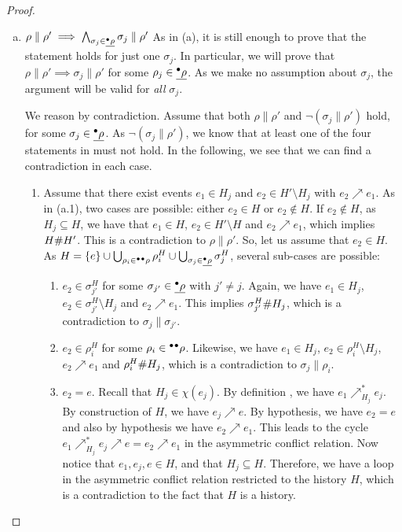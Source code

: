 \begin{proof}
\begin{enumerate}[(a)]
\item $\rho \parallel \rho' \implies \bigwedge_{\sigma_j \in \underline{{}^\bullet\rho}}
\sigma_j \parallel \rho'$  As in (a), it is still enough to prove that the
statement holds for just one $\sigma_j$.  In particular, we will prove that
$\rho \parallel \rho' \implies \sigma_j \parallel \rho'$ for some $\rho_j \in
\underline{{}^\bullet\rho}$.  As we make no assumption about $\sigma_j$, the argument will be
valid for \emph{all} $\sigma_j$.

We reason by contradiction.  Assume that both $\rho \parallel \rho'$ and $\lnot
(\sigma_j \parallel \rho')$ hold, for some $\sigma_j \in \underline{{}^\bullet\rho}$.  As
$\lnot (\sigma_j \parallel \rho')$, we know that at least one of the four
statements in  must not hold.  In the following, we see
that we can find a contradiction in each case.

\begin{enumerate}[1.]
\item Assume that there exist events $e_1 \in H_j$ and $e_2 \in H' \setminus
H_j$ with $e_2 \nearrow e_1$.  As in (a.1), two cases are possible: either $e_2
\in H$ or $e_2 \notin H$.  If $e_2 \notin H$, as $H_j \subseteq H$, we have
that $e_1 \in H$, $e_2 \in H' \setminus H$ and $e_2 \nearrow e_1$, which
implies $H \mathord{\#} H'$.  This is a contradiction to $\rho \parallel \rho'$.  So,
let us assume that $e_2 \in H$.  As $H = \{e\} \cup \bigcup_{\rho_i \in
{}^\bullet{}^\bullet\rho} \rho^H_i \cup \bigcup_{\sigma_j \in \underline{{}^\bullet\rho}}
\sigma^H_j$, several sub-cases are possible:

\begin{enumerate}
\item $e_2 \in \sigma^H_{j'}$ for some $\sigma_{j'} \in \underline{{}^\bullet\rho}$ with
$j' \not= j$.  Again, we have $e_1 \in H_j$, $e_2 \in \sigma^H_{j'} \setminus
H_j$ and $e_2 \nearrow e_1$.  This implies $\sigma^H_{j'} \mathord{\#} H_j$, which is
a contradiction to $\sigma_j \parallel \sigma_{j'}$.

\item $e_2 \in \rho^H_i$ for some $\rho_i \in {}^\bullet{}^\bullet\rho$.  Likewise, we
have $e_1 \in H_j$, $e_2 \in \rho^H_i \setminus H_j$, $e_2 \nearrow e_1$ and
$\rho^H_i \mathord{\#} H_j$, which is a contradiction to $\sigma_j \parallel \rho_i$.

\item $e_2 = e$.  Recall that $H_j \in \chi (e_j)$.  By definition
, we have $e_1 \nearrow^*_{H_j} e_j$.  By construction of $H$, we
have $e_j \nearrow e$.  By hypothesis, we have $e_2 = e$ and also by hypothesis
we have $e_2 \nearrow e_1$.  This leads to the cycle $e_1 \nearrow^*_{H_j} e_j
\nearrow e = e_2 \nearrow e_1$ in the asymmetric conflict relation.  Now notice
that $e_1, e_j, e \in H$, and that $H_j \subseteq H$.  Therefore, we have a
loop in the asymmetric conflict relation restricted to the history $H$, which
is a contradiction to the fact that $H$ is a history.
\end{enumerate}


\end{enumerate}
\end{enumerate}
\end{proof}
